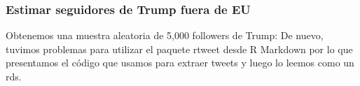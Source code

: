 \documentclass[
]{article}
\newenvironment{Shaded}{\begin{snugshade}}{\end{snugshade}}
\newcommand{\CommentTok}[1]{\textcolor[rgb]{0.56,0.35,0.01}{\textit{#1}}}
\newcommand{\DataTypeTok}[1]{\textcolor[rgb]{0.13,0.29,0.53}{#1}}
\newcommand{\DecValTok}[1]{\textcolor[rgb]{0.00,0.00,0.81}{#1}}
\newcommand{\KeywordTok}[1]{\textcolor[rgb]{0.13,0.29,0.53}{\textbf{#1}}}
\newcommand{\NormalTok}[1]{#1}
\newcommand{\OperatorTok}[1]{\textcolor[rgb]{0.81,0.36,0.00}{\textbf{#1}}}
\newcommand{\StringTok}[1]{\textcolor[rgb]{0.31,0.60,0.02}{#1}}
\begin{document}
\hypertarget{estimar-seguidores-de-trump-fuera-de-eu}{%
\subsubsection{Estimar seguidores de Trump fuera de
EU}\label{estimar-seguidores-de-trump-fuera-de-eu}}

Obtenemos una muestra aleatoria de 5,000 followers de Trump: De nuevo,
tuvimos problemas para utilizar el paquete rtweet desde R Markdown por
lo que presentamos el código que usamos para extraer tweets y luego lo
leemos como un rds.

\begin{Shaded}
\end{Shaded}
\end{document}
